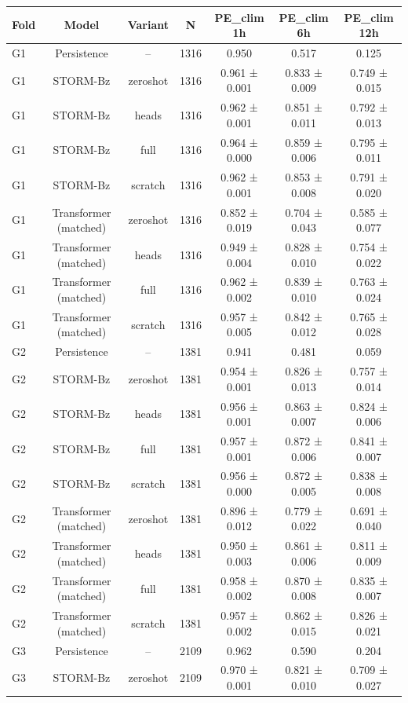 \begin{tabular}{lcccccc}
\toprule
Fold & Model & Variant & N & PE\_clim 1h & PE\_clim 6h & PE\_clim 12h \\
\midrule
G1 & Persistence & -- & 1316 & 0.950 & 0.517 & 0.125 \\
G1 & STORM-Bz & zeroshot & 1316 & 0.961 ± 0.001 & 0.833 ± 0.009 & 0.749 ± 0.015 \\
G1 & STORM-Bz & heads & 1316 & 0.962 ± 0.001 & 0.851 ± 0.011 & 0.792 ± 0.013 \\
G1 & STORM-Bz & full & 1316 & 0.964 ± 0.000 & 0.859 ± 0.006 & 0.795 ± 0.011 \\
G1 & STORM-Bz & scratch & 1316 & 0.962 ± 0.001 & 0.853 ± 0.008 & 0.791 ± 0.020 \\
G1 & Transformer (matched) & zeroshot & 1316 & 0.852 ± 0.019 & 0.704 ± 0.043 & 0.585 ± 0.077 \\
G1 & Transformer (matched) & heads & 1316 & 0.949 ± 0.004 & 0.828 ± 0.010 & 0.754 ± 0.022 \\
G1 & Transformer (matched) & full & 1316 & 0.962 ± 0.002 & 0.839 ± 0.010 & 0.763 ± 0.024 \\
G1 & Transformer (matched) & scratch & 1316 & 0.957 ± 0.005 & 0.842 ± 0.012 & 0.765 ± 0.028 \\
G2 & Persistence & -- & 1381 & 0.941 & 0.481 & 0.059 \\
G2 & STORM-Bz & zeroshot & 1381 & 0.954 ± 0.001 & 0.826 ± 0.013 & 0.757 ± 0.014 \\
G2 & STORM-Bz & heads & 1381 & 0.956 ± 0.001 & 0.863 ± 0.007 & 0.824 ± 0.006 \\
G2 & STORM-Bz & full & 1381 & 0.957 ± 0.001 & 0.872 ± 0.006 & 0.841 ± 0.007 \\
G2 & STORM-Bz & scratch & 1381 & 0.956 ± 0.000 & 0.872 ± 0.005 & 0.838 ± 0.008 \\
G2 & Transformer (matched) & zeroshot & 1381 & 0.896 ± 0.012 & 0.779 ± 0.022 & 0.691 ± 0.040 \\
G2 & Transformer (matched) & heads & 1381 & 0.950 ± 0.003 & 0.861 ± 0.006 & 0.811 ± 0.009 \\
G2 & Transformer (matched) & full & 1381 & 0.958 ± 0.002 & 0.870 ± 0.008 & 0.835 ± 0.007 \\
G2 & Transformer (matched) & scratch & 1381 & 0.957 ± 0.002 & 0.862 ± 0.015 & 0.826 ± 0.021 \\
G3 & Persistence & -- & 2109 & 0.962 & 0.590 & 0.204 \\
G3 & STORM-Bz & zeroshot & 2109 & 0.970 ± 0.001 & 0.821 ± 0.010 & 0.709 ± 0.027 \\

\end{tabular}
